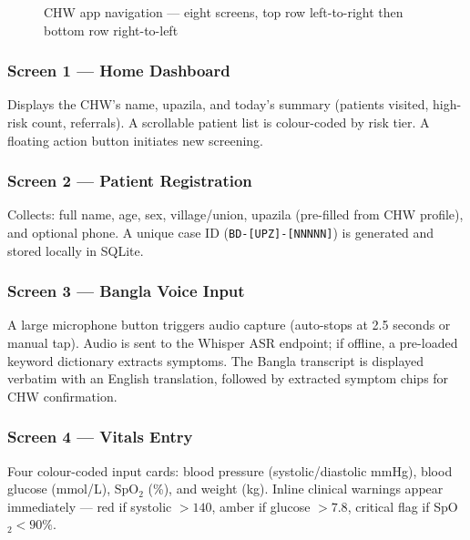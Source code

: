 \documentclass[12pt, a4paper]{article}
\newcommand{\code}[1]{\texttt{\small#1}}
\begin{document}
\begin{figure}[H]
{
}
\caption{CHW app navigation — eight screens, top row left-to-right then bottom row right-to-left}
\label{fig:screens}
\end{figure}

\FloatBarrier

\subsubsection{Screen 1 — Home Dashboard}
Displays the CHW's name, upazila, and today's summary (patients visited, high-risk count, referrals). A scrollable patient list is colour-coded by risk tier. A floating action button initiates new screening.

\subsubsection{Screen 2 — Patient Registration}
Collects: full name, age, sex, village/union, upazila (pre-filled from CHW profile), and optional phone. A unique case ID (\code{BD-[UPZ]-[NNNNN]}) is generated and stored locally in SQLite.

\subsubsection{Screen 3 — Bangla Voice Input}
A large microphone button triggers audio capture (auto-stops at 2.5 seconds or manual tap). Audio is sent to the Whisper ASR endpoint; if offline, a pre-loaded keyword dictionary extracts symptoms. The Bangla transcript is displayed verbatim with an English translation, followed by extracted symptom chips for CHW confirmation.

\subsubsection{Screen 4 — Vitals Entry}
Four colour-coded input cards: blood pressure (systolic/diastolic mmHg), blood glucose (mmol/L), SpO$_2$ (\%), and weight (kg). Inline clinical warnings appear immediately — red if systolic $>140$, amber if glucose $>7.8$, critical flag if SpO$_2 < 90\%$.
\end{document}
